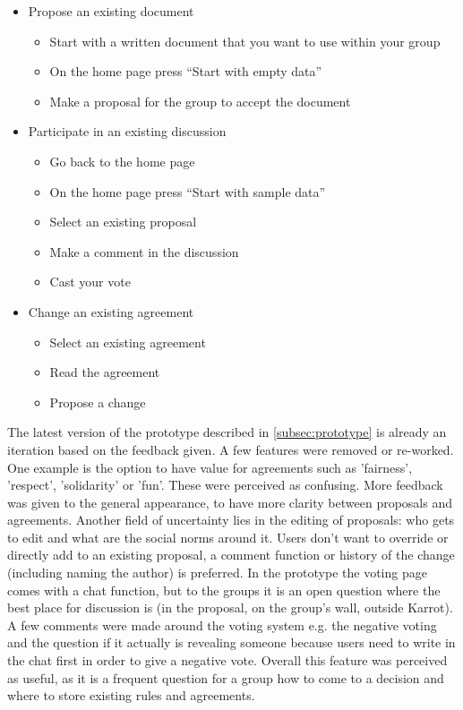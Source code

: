 \documentclass[
	a4paper,%
	11pt,%
	]{article}
\begin{document}
\begin{itemize}
	\item Propose an existing document
		\begin{itemize}
			 \item Start with a written document that you want to use within your group
			 \item On the home page press “Start with empty data”
			 \item Make a proposal for the group to accept the document
		\end{itemize}
	\item Participate in an existing discussion
		\begin{itemize}
  			  \item Go back to the home page
  			  \item On the home page press “Start with sample data”
   			  \item Select an existing proposal
    			  \item Make a comment in the discussion
    		  	  \item Cast your vote
		\end{itemize}
	\item Change an existing agreement
		\begin{itemize}
   			 \item Select an existing agreement
    			 \item Read the agreement
    			 \item Propose a change
		\end{itemize}	
	
\end{itemize}

The latest version of the prototype described in \autoref{subsec:prototype} is already an iteration based on the feedback given. A few features were removed or re-worked. One example is the option to have value for agreements such as 'fairness', 'respect', 'solidarity' or 'fun'. These were perceived as confusing. More feedback was given to the general appearance, to have more clarity between proposals and agreements. Another field of uncertainty lies in the editing of proposals: who gets to edit and what are the social norms around it. Users don't want to override or directly add to an existing proposal, a comment function or history of the change (including naming the author) is preferred. In the prototype the voting page comes with a chat function, but to the groups it is an open question where the best place for discussion is (in the proposal, on the group's wall, outside Karrot). A few comments were made around the voting system e.g. the negative voting and the question if it actually is revealing someone because users need to write in the chat first in order to give a negative vote. Overall this feature was perceived as useful, as it is a frequent question for a group how to come to a decision and where to store existing rules and agreements.
\end{document}

